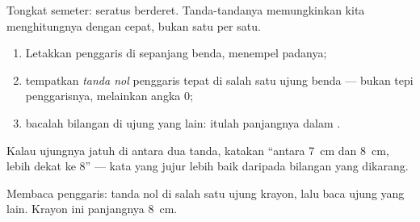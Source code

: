 \begin{omfigure}

{\small Tongkat semeter: seratus  berderet. Tanda-tandanya
memungkinkan kita menghitungnya dengan cepat, bukan satu per satu.}
\end{omfigure}

\begin{method}\label{met:g2:measuring-length:ruler}
\begin{enumerate}
  \item Letakkan penggaris di sepanjang benda, menempel padanya;
  \item tempatkan \emph{tanda nol} penggaris tepat di salah satu ujung
        benda --- bukan tepi penggarisnya, melainkan angka $0$;
  \item bacalah bilangan di ujung yang lain: itulah panjangnya dalam
        .
\end{enumerate}
Kalau ujungnya jatuh di antara dua tanda, katakan ``antara \qty{7}{cm}
dan \qty{8}{cm}, lebih dekat ke $8$'' --- kata yang jujur lebih baik
daripada bilangan yang dikarang.
\end{method}

\begin{omfigure}

{\small Membaca penggaris: tanda nol di salah satu ujung krayon, lalu
baca ujung yang lain. Krayon ini panjangnya \qty{8}{cm}.}
\end{omfigure}

